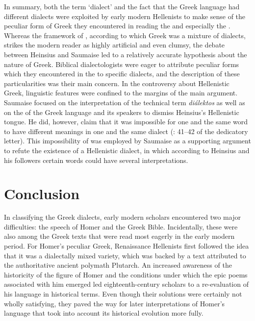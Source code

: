 In summary, both the term ‘dialect’ and the fact that the Greek language had different dialects were exploited by early modern Hellenists to make sense of the peculiar form of Greek they encountered in reading the  and especially the . Whereas the framework of , according to which  Greek was a mixture of dialects, strikes the modern reader as highly artificial and even clumsy, the debate between Heinsius and Saumaise led to a relatively accurate hypothesis about the nature of  Greek. Biblical dialectologists were eager to attribute peculiar forms which they encountered in the  to specific dialects, and the description of these particularities was their main concern. In the controversy about Hellenistic Greek, linguistic features were confined to the margins of the main argument. Saumaise focused on the interpretation of the technical term \textit{diálektos} as well as on the  of the Greek language and its speakers to dismiss Heinsius’s Hellenistic tongue. He did, however, claim that it was impossible for one and the same word to have different meanings in one and the same dialect (\citealt{Saumaise1643a}: 41–42 of the dedicatory letter). This impossibility of  was employed by Saumaise as a supporting argument to refute the existence of a Hellenistic dialect, in which according to Heinsius and his followers certain words could have several interpretations.

\section{Conclusion}\label{sec:4.7}

In classifying the Greek dialects, early modern scholars encountered two major difficulties: the speech of Homer and the Greek Bible. Incidentally, these were also among the Greek texts that were read most eagerly in the early modern period. For Homer’s peculiar Greek, Renaissance Hellenists first followed the idea that it was a dialectally mixed variety, which was backed by a text attributed to the authoritative ancient polymath Plutarch. An increased awareness of the historicity of the figure of Homer and the conditions under which the epic poems associated with him emerged led eighteenth-century scholars to a re-evaluation of his language in historical terms. Even though their solutions were certainly not wholly satisfying, they paved the way for later interpretations of Homer’s language that took into account its historical evolution more fully.

